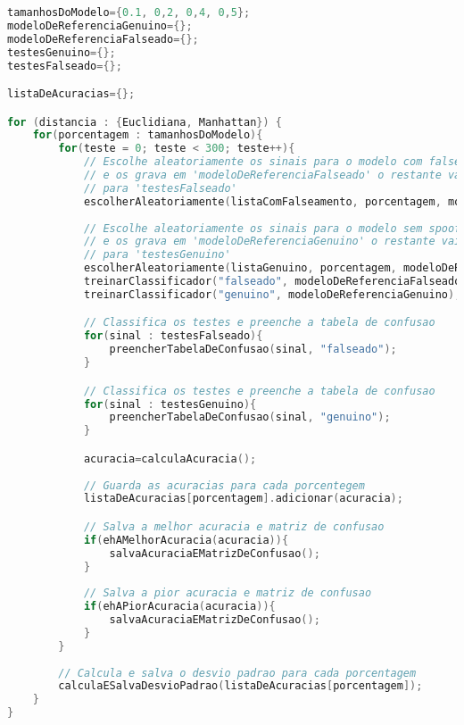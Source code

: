 \begin{lstlisting}[language=C++, caption={Algoritmo que caracteriza o procedimento 02}, label={lst:experiment02Algo}]
tamanhosDoModelo={0.1, 0,2, 0,4, 0,5};
modeloDeReferenciaGenuino={};
modeloDeReferenciaFalseado={};
testesGenuino={};
testesFalseado={};

listaDeAcuracias={};

for (distancia : {Euclidiana, Manhattan}) {
	for(porcentagem : tamanhosDoModelo){
		for(teste = 0; teste < 300; teste++){
			// Escolhe aleatoriamente os sinais para o modelo com falseamento 
			// e os grava em 'modeloDeReferenciaFalseado' o restante vai 
			// para 'testesFalseado'
			escolherAleatoriamente(listaComFalseamento, porcentagem, modeloDeReferenciaFalseado, testesFalseado);
			
			// Escolhe aleatoriamente os sinais para o modelo sem spoofing
			// e os grava em 'modeloDeReferenciaGenuino' o restante vai 
			// para 'testesGenuino'
			escolherAleatoriamente(listaGenuino, porcentagem, modeloDeReferenciaGenuino, testesGenuino);
			treinarClassificador("falseado", modeloDeReferenciaFalseado);
			treinarClassificador("genuino", modeloDeReferenciaGenuino);

			// Classifica os testes e preenche a tabela de confusao
			for(sinal : testesFalseado){
				preencherTabelaDeConfusao(sinal, "falseado");
			} 

			// Classifica os testes e preenche a tabela de confusao
			for(sinal : testesGenuino){
				preencherTabelaDeConfusao(sinal, "genuino");
			}

			acuracia=calculaAcuracia();
			
			// Guarda as acuracias para cada porcentegem
			listaDeAcuracias[porcentagem].adicionar(acuracia);

			// Salva a melhor acuracia e matriz de confusao
			if(ehAMelhorAcuracia(acuracia)){
				salvaAcuraciaEMatrizDeConfusao();
			}
			
			// Salva a pior acuracia e matriz de confusao
			if(ehAPiorAcuracia(acuracia)){
				salvaAcuraciaEMatrizDeConfusao();
			}
		}
		
		// Calcula e salva o desvio padrao para cada porcentagem
		calculaESalvaDesvioPadrao(listaDeAcuracias[porcentagem]);
	}
}				
\end{lstlisting}